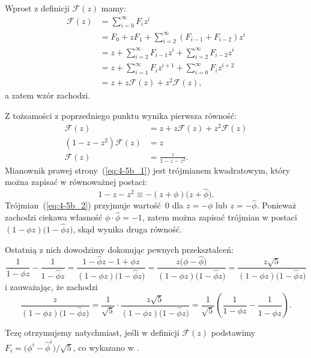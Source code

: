 
\subexercise{} %
Wprost z definicji $\mathcal{F}(z)$ mamy:
\begin{align*}
	\mathcal{F}(z) &= \sum_{i=0}^\infty F_iz^i \\
	&= F_0+zF_1+\sum_{i=2}^\infty (F_{i-1}+F_{i-2})z^i \\
	&= z+\sum_{i=2}^\infty F_{i-1}z^i+\sum_{i=2}^\infty F_{i-2}z^i \\
	&= z+\sum_{i=1}^\infty F_iz^{i+1}+\sum_{i=0}^\infty F_iz^{i+2} \\[2mm]
	&= z+z\mathcal{F}(z)+z^2\mathcal{F}(z),
\end{align*}
a zatem wzór zachodzi.

\subexercise{} %
Z tożsamości z poprzedniego punktu wynika pierwsza równość:
\begin{align}
	\mathcal{F}(z) &= z+z\mathcal{F}(z)+z^2\mathcal{F}(z) \nonumber \\
	(1-z-z^2)\mathcal{F}(z) &= z \nonumber \\
	\mathcal{F}(z) &= \frac{z}{1-z-z^2}. \label{eq:4-5b_1}
\end{align}
Mianownik prawej strony~(\ref{eq:4-5b_1}) jest trójmianem kwadratowym, który można zapisać w równoważnej postaci:
\begin{equation}
	1-z-z^2 \equiv -(z+\phi)\bigl(z+\widehat\phi\bigr). \label{eq:4-5b_2}
\end{equation}
Trójmian~(\ref{eq:4-5b_2}) przyjmuje wartość~0 dla $z=-\phi$ lub $z=-\widehat\phi$. Ponieważ zachodzi ciekawa własność $\phi\cdot\widehat\phi=-1$, zatem można zapisać trójmian w postaci $(1-\phi z)\bigl(1-\widehat\phi z\bigr)$, skąd wynika druga równość.

Ostatnią z nich dowodzimy dokonując pewnych przekształceń:
\[
	\frac{1}{1-\phi z}-\frac{1}{1-\widehat\phi z} = \frac{1-\widehat\phi z-1+\phi z}{(1-\phi z)\bigl(1-\widehat\phi z\bigr)} = \frac{z\bigl(\phi-\widehat\phi\bigr)}{(1-\phi z)\bigl(1-\widehat\phi z\bigr)} = \frac{z\sqrt{5}}{(1-\phi z)\bigl(1-\widehat\phi z\bigr)}
\]
i zauważając, że zachodzi
\[
	\frac{z}{(1-\phi z)\bigl(1-\widehat\phi z\bigr)} = \frac{1}{\sqrt{5}}\cdot\frac{z\sqrt{5}}{(1-\phi z)\bigl(1-\widehat\phi z\bigr)} = \frac{1}{\sqrt{5}}\left(\frac{1}{1-\phi z}-\frac{1}{1-\widehat\phi z}\right).
\]

\subexercise{} %
Tezę otrzymujemy natychmiast, jeśli w definicji $\mathcal{F}(z)$ podstawimy $F_i=\bigl(\phi^i-\widehat\phi^i\bigr)/\sqrt{5}$, co wykazano w .

